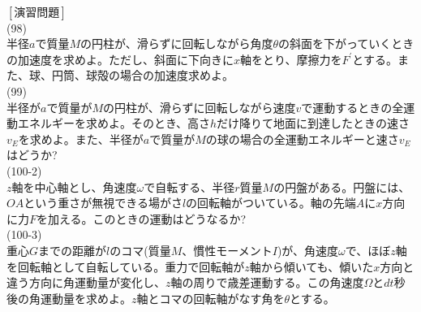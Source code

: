 \documentclass{jsarticle}
\begin{document}
\\
\newpage
\noindent
\([演習問題]\)\\
(98)\\
半径\(a\)で質量\(M\)の円柱が、滑らずに回転しながら角度\(\theta\)の斜面を下がっていくときの加速度を求めよ。ただし、斜面に下向きに\(x\)軸をとり、摩擦力を\(F^{\prime}\)とする。また、球、円筒、球殻の場合の加速度求めよ。\\
(99)\\
半径が\(a\)で質量が\(M\)の円柱が、滑らずに回転しながら速度\(v\)で運動するときの全運動エネルギーを求めよ。そのとき、高さ\(h\)だけ降りて地面に到達したときの速さ\(v_{E}\)を求めよ。また、半径が\(a\)で質量が\(M\)の球の場合の全運動エネルギーと速さ\(v_{E}\)はどうか?\\
(100-2)\\
\(z\)軸を中心軸とし、角速度\(\omega\)で自転する、半径\(r\)質量\(M\)の円盤がある。円盤には、\(OA\)という重さが無視できる場がさ\(l\)の回転軸がついている。軸の先端\(A\)に\(x\)方向に力\(F\)を加える。このときの運動はどうなるか?\\
(100-3)\\
重心\(G\)までの距離が\(l\)のコマ(質量\(M\)、慣性モーメント\(I\))が、角速度\(\omega\)で、ほぼ\(z\)軸を回転軸として自転している。重力で回転軸が\(z\)軸から傾いても、傾いた\(x\)方向と違う方向に角運動量が変化し、\(z\)軸の周りで歳差運動する。この角速度\(\Omega\)と\(dt\)秒後の角運動量を求めよ。\(z\)軸とコマの回転軸がなす角を\(\theta\)とする。\\
\end{document}
